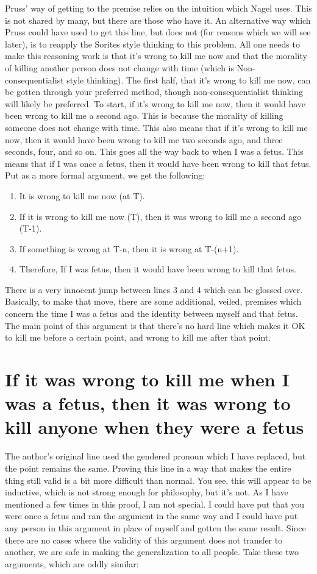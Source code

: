 Pruss' way of getting to the premise relies on the intuition which Nagel uses. This is not shared by many, but there are those who have it. An alternative way which Pruss could have used to get this line, but does not (for reasons which we will see later), is to reapply the Sorites style thinking to this problem. All one needs to make this reasoning work is that it's wrong to kill me now and that the morality of killing another person does not change with time (which is Non-consequentialist style thinking).  The first half, that it's wrong to kill me now, can be gotten through your preferred method, though non-consequentialist thinking will likely be preferred. To start, if it's wrong to kill me now, then it would have been wrong to kill me a second ago. This is because the morality of killing someone does not change with time. This also means that if it's wrong to kill me now, then it would have been wrong to kill me two seconds ago, and three seconds, four, and so on. This goes all the way back to when I was a fetus. This means that if I was once a fetus, then it would have been wrong to kill that fetus. Put as a more formal argument, we get the following:
\begin{enumerate}
    \item It is wrong to kill me now (at T).
    \item If it is wrong to kill me now (T), then it was wrong to kill me a second ago (T-1).
    \item If something is wrong at T-n, then it is wrong at T-(n+1).
    \item Therefore, If I was fetus, then it would have been wrong to kill that fetus.
\end{enumerate}
There is a very innocent jump between lines 3 and 4 which can be glossed over. Basically, to make that move, there are some additional, veiled, premises which concern the time I was a fetus and the identity between myself and that fetus. The main point of this argument is that there's no hard line which makes it OK to kill me before a certain point, and wrong to kill me after that point. 

\section{If it was wrong to kill me when I was a fetus, then it was wrong to kill anyone when they were a fetus}

The author's original line used the gendered pronoun which I have replaced, but the point remains the same. Proving this line in a way that makes the entire thing still valid is a bit more difficult than normal. You see, this will appear to be inductive, which is not strong enough for philosophy, but it's not. As I have mentioned a few times in this proof, I am not special. I could have put that you were once a fetus and ran the argument in the same way and I could have put any person in this argument in place of myself and gotten the same result. Since there are no cases where the validity of this argument does not transfer to another, we are safe in making the generalization to all people. Take these two arguments, which are oddly similar:

